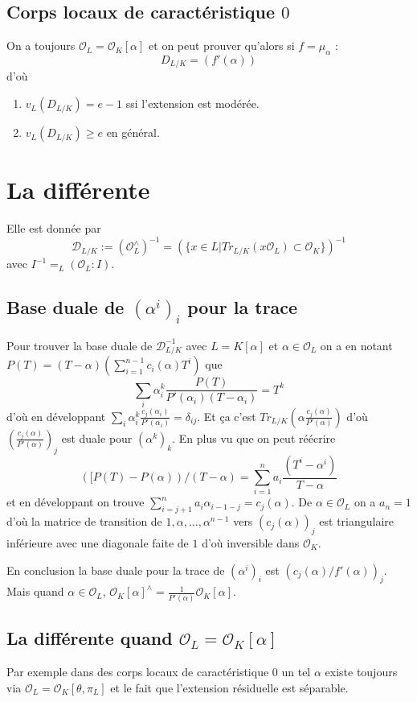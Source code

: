 \documentclass[a4paper,12pt]{book}
\newcommand{\Or}{\mathcal{O}}
\newcommand{\D}{\mathscr{D}}
\theoremstyle{plain}
\theoremstyle{definition}
\theoremstyle{remark}
\begin{document}
\subsection{Corps locaux de caractéristique $0$}
On a toujours $\Or_L=\Or_K[\alpha]$ et on peut prouver
qu'alors si $f=\mu_\alpha$ :
\[D_{L/K}=(f'(\alpha))\]
d'où 
\begin{enumerate}
    \item $v_L(D_{L/K})=e-1$ ssi l'extension est modérée.
    \item $v_L(D_{L/K})\geq e$ en général.
\end{enumerate}

\section{La différente}
Elle est donnée par 
\[\D_{L/K}:=(\Or_L^\wedge)^{-1}=(\{x\in L| Tr_{L/K}(x\Or_L)\subset \Or_K\})^{-1}\]
avec $I^{-1}=_L(\Or_L:I)$.

\subsection{Base duale de $(\alpha^i)_i$ pour la trace}
Pour trouver la base duale de $\D_{L/K}^{-1}$
avec $L=K[\alpha]$ et $\alpha\in \Or_L$ on a en notant 
$P(T)=(T-\alpha)(\sum_{i=1}^{n-1} c_i(\alpha)T^i)$ que 
\[\sum_i \alpha_i^k\frac{P(T)}{P'(\alpha_i)(T-\alpha_i)}=T^k\]
d'où en développant 
$\sum_i \alpha_i^k\frac{c_j(\alpha_i)}{P'(\alpha_i)}=\delta_{ij}$.
Et ça c'est $Tr_{L/K}(\alpha\frac{c_j(\alpha)}{P'(\alpha)})$ d'où
$(\frac{c_j(\alpha)}{P'(\alpha)})_j$ est duale pour $(\alpha^k)_k$.
En plus vu que on peut réécrire 
\[([P(T)-P(\alpha))/(T-\alpha)=\sum_{i=1}^n a_i\frac{(T^i-\alpha^i)}{T-\alpha}\]
et en développant on trouve $\sum_{i=j+1}^n a_i\alpha_{i-1-j}=c_j(\alpha)$.
De $\alpha\in\Or_L$ on a $a_n=1$ d'où la matrice de transition de 
$1,\alpha,\ldots,\alpha^{n-1}$ vers $(c_j(\alpha))_j$ est triangulaire
inférieure avec une diagonale faite de $1$ d'où inversible dans 
$\Or_K$.

En conclusion la base duale
pour la trace de $(\alpha^i)_i$ est $(c_j(\alpha)/f'(\alpha))_j$.
Mais quand $\alpha\in\Or_L$, 
$\Or_K[\alpha]^\wedge=\frac{1}{P'(\alpha)}\Or_K[\alpha]$.
\subsection{La différente quand $\Or_L=\Or_K[\alpha]$}
Par exemple dans des corps locaux de caractéristique $0$ un tel
$\alpha$ existe toujours via $\Or_L=\Or_K[\theta,\pi_L]$ et
le fait que l'extension résiduelle est séparable.
\end{document}
